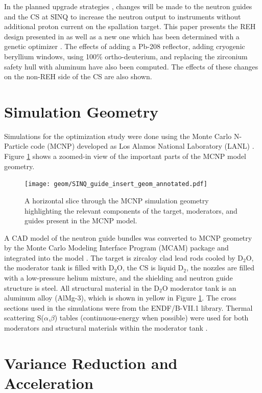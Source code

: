 \documentclass[a4paper]{jpconf}
\begin{document}
In the planned upgrade strategies \cite{rueegg_icans}, changes will be made to the neutron guides and the CS at SINQ to increase the neutron output to instruments without additional proton current on the spallation target.  This paper presents the REH design presented in \cite{ecns} as well as a new one which has been determined with a genetic optimizer \cite{deap}.   The effects of adding a Pb-208 reflector, adding cryogenic beryllium windows, using 100\% ortho-deuterium, and replacing the zirconium safety hull with aluminum have also been computed.  The effects of these changes on the non-REH side of the CS are also shown.


\section{Simulation Geometry}

Simulations for the optimization study were done using the Monte Carlo N-Particle code (MCNP) developed as Los Alamos National Laboratory (LANL) \cite{mcnp6}.  Figure \ref{geom} shows a zoomed-in view of the important parts of the MCNP model geometry.  

\begin{figure}[h!]
\begin{center}
\texttt{[image: geom/SINQ\_guide\_insert\_geom\_annotated.pdf]}
\end{center}
\caption{\label{geom}A horizontal slice through the MCNP simulation geometry highlighting the relevant components of the target, moderators, and guides present in the MCNP model.}
\end{figure}

A CAD model of the neutron guide bundles was converted to MCNP geometry by the Monte Carlo Modeling Interface Program (MCAM) package and integrated into the model \cite{mcam}.  The target is zircaloy clad lead rods cooled by D$_2$O, the moderator tank is filled with D$_2$O, the CS is liquid D$_2$, the nozzles are filled with a low-pressure helium mixture, and the shielding and neutron guide structure is steel.  All structural material in the D$_2$O moderator tank is an aluminum alloy (AlMg-3), which is shown in yellow in Figure \ref{geom}.  The cross sections used in the simulations were from the ENDF/B-VII.1 library.  Thermal scattering S($\alpha$,$\beta$) tables (continuous-energy when possible) were used for both moderators and structural materials within the moderator tank \cite{sab, ike}.

\section{Variance Reduction and Acceleration}
\end{document}
